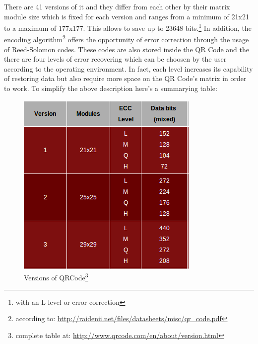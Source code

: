 There are 41 versions of it and they differ from each other by their matrix 
module size which is fixed for each version and ranges from a minimum of 21x21 
to a maximum of 177x177. This allows to save up to 23648 bits.\footnote{with an L level or error correction} 
\newline 
In addition, the encoding algorithm\footnote{ according to: \url{http://raidenii.net/files/datasheets/misc/qr_code.pdf}} offers the opportunity of error correction through the usage of Reed-Solomon codes.
These codes are also stored inside the QR Code and the there are four levels of error recovering which can be choosen by the user according to the operating environment.
In fact, each level increases its capability of restoring data but also require more space on the QR Code's matrix in order to work. 
\newpage
To simplify the above description here's a summarying table:
\begin{figure}[hbt]
    \centering
    \caption{Versions of QRCode\footnote{complete table at: \url{http://www.qrcode.com/en/about/version.html}}}
    \includegraphics[scale=0.9]{img/qrversion.png}
\end{figure}


   













  
